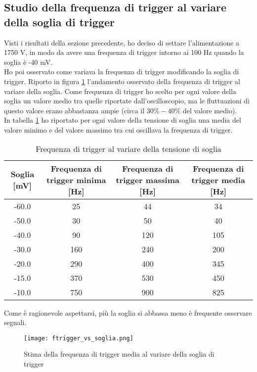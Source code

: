 \documentclass{article}
\begin{document}
\subsection{Studio della frequenza di trigger al variare della soglia di trigger}
Visti i risultati della sezione precedente, ho deciso di settare l'alimentazione a 1750 V, in modo da avere una frequenza di trigger intorno ai 100 Hz quando la soglia è -40 mV. 
\\
Ho poi osservato come variava la frequenza di trigger modificando la soglia di trigger. Riporto in figura \ref{f1} l'andamento osservato della frequenza di trigger al variare della soglia. Come frequenza di trigger ho scelto per ogni valore della soglia un valore medio tra quelle riportate dall'oscilloscopio, ma le fluttuazioni di questo valore erano abbastanza ampie (circa il $30\%-40\%$ del valore medio). \\
In tabella \ref{tabfreq} ho riportato per ogni valore della tensione di soglia una media del valore minimo e del valore massimo tra cui oscillava la frequenza di trigger. 

\begin{table}[h!]
    \centering
    \begin{tabular}{|c|c|c|c|}
        \hline
        Soglia [mV] & Frequenza di trigger minima [Hz]& Frequenza di trigger massima [Hz] & Frequenza di trigger media [Hz]\\
        \hline
            -60.0& 25& 44& 34\\
            -50.0& 30& 50& 40\\
            -40.0& 90& 120& 105 \\
            -30.0& 160& 240& 200\\
            -20.0& 290& 400& 345\\
            -15.0& 370& 530& 450\\
            -10.0& 750& 900& 825\\
        \hline
    \end{tabular}
    \caption{Frequenza di trigger al variare della tensione di soglia}
    \label{tabfreq}
\end{table}





Come è ragionevole aspettarsi, più la soglia si abbassa meno è frequente osservare segnali. 
\vspace{4mm}
\begin{figure}[h]
\begin{center}
\texttt{[image: ftrigger\_vs\_soglia.png]}
\caption{Stima della frequenza di trigger media al variare della soglia di trigger} \label{f1}
\end{center}
\end{figure}
\end{document}

